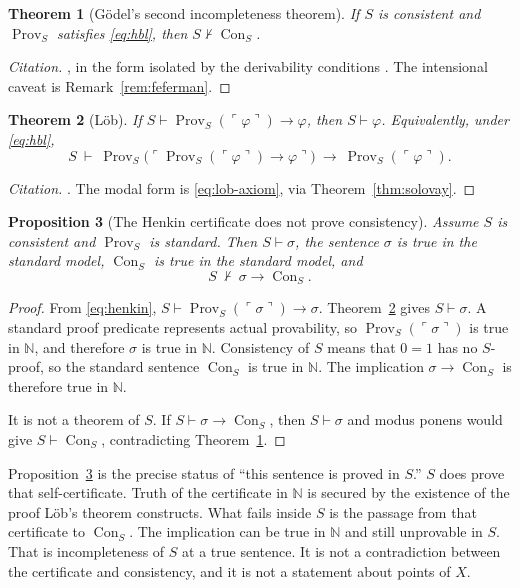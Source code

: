 \documentclass[11pt]{article}
\newcommand{\Nat}{\mathbb{N}}
\newcommand{\gn}[1]{\ulcorner #1 \urcorner}
\DeclareMathOperator{\Prov}{Prov}
\DeclareMathOperator{\Con}{Con}
\newtheorem{theorem}{Theorem}
\newtheorem{proposition}[theorem]{Proposition}
\theoremstyle{definition}
\theoremstyle{remark}
\begin{document}
\begin{theorem}[G\"odel's second incompleteness theorem]
\label{thm:g2}
If \(S\) is consistent and \(\Prov_{S}\) satisfies \eqref{eq:hbl}, then \(S\nvdash\Con_{S}\).
\end{theorem}

\begin{proof}[Citation]
\citet{godel1931}, in the form isolated by the derivability conditions \citep{hilbertbernays1939,lob1955,boolos1993}.
The intensional caveat is Remark~\ref{rem:feferman}.
\end{proof}

\begin{theorem}[L\"ob]
\label{thm:lob}
If \(S\vdash \Prov_{S}(\gn{\varphi})\to\varphi\), then \(S\vdash\varphi\).
Equivalently, under \eqref{eq:hbl},
\[
S\ \vdash\ \Prov_{S}\bigl(\gn{\Prov_{S}(\gn{\varphi})\to\varphi}\bigr)\ \to\ \Prov_{S}(\gn{\varphi}).
\]
\end{theorem}

\begin{proof}[Citation]
\citet{lob1955}.
The modal form is \eqref{eq:lob-axiom}, via Theorem~\ref{thm:solovay}.
\end{proof}

\begin{proposition}[The Henkin certificate does not prove consistency]
\label{prop:henkin}
Assume \(S\) is consistent and \(\Prov_{S}\) is standard.
Then \(S\vdash\sigma\), the sentence \(\sigma\) is true in the standard model, \(\Con_{S}\) is true in the standard model, and
\[
S\ \nvdash\ \sigma\to\Con_{S}.
\]
\end{proposition}

\begin{proof}
From \eqref{eq:henkin}, \(S\vdash \Prov_{S}(\gn{\sigma})\to\sigma\).
Theorem~\ref{thm:lob} gives \(S\vdash\sigma\).
A standard proof predicate represents actual provability, so \(\Prov_{S}(\gn{\sigma})\) is true in \(\Nat\), and therefore \(\sigma\) is true in \(\Nat\).
Consistency of \(S\) means that \(0=1\) has no \(S\)-proof, so the standard sentence \(\Con_{S}\) is true in \(\Nat\).
The implication \(\sigma\to\Con_{S}\) is therefore true in \(\Nat\).

It is not a theorem of \(S\).
If \(S\vdash\sigma\to\Con_{S}\), then \(S\vdash\sigma\) and modus ponens would give \(S\vdash\Con_{S}\), contradicting Theorem~\ref{thm:g2}.
\end{proof}

Proposition~\ref{prop:henkin} is the precise status of ``this sentence is proved in \(S\).''
\(S\) does prove that self-certificate.
Truth of the certificate in \(\Nat\) is secured by the existence of the proof L\"ob's theorem constructs.
What fails inside \(S\) is the passage from that certificate to \(\Con_{S}\).
The implication can be true in \(\Nat\) and still unprovable in \(S\).
That is incompleteness of \(S\) at a true sentence.
It is not a contradiction between the certificate and consistency, and it is not a statement about points of \(X\).
\end{document}
